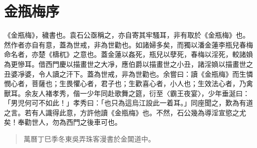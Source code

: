 \chapter*{金瓶梅序}


《金瓶梅》，穢書也。袁石公亟稱之，亦自寄其牢騷耳，非有取於《金瓶梅》也。然作者亦自有意，蓋為世戒，非為世勸也。如諸婦多矣，而獨以潘金蓮李瓶兒春梅命名者，亦楚《檮杌》之意也。蓋金蓮以姦死，瓶兒以孽死，春梅以淫死，較諸媍為更慘耳。借西門慶以描畫世之大凈，應伯爵以描畫世之小丑，諸淫媍以描畫世之丑婆凈婆，令人讀之汗下。蓋為世戒，非為世勸也。余嘗曰：讀《金瓶梅》而生憐憫心者，菩薩也；生畏懼心者，君子也；生歡喜心者，小人也；生效法心者，乃禽獸耳。余友人褚孝秀，偕一少年同赴歌舞之筵，衍至〈霸王夜宴〉，少年垂涎曰：「男児何可不如此！」孝秀曰：「也只為這烏江設此一着耳。」同座聞之，歎為有道之言。若有人識得此意，方許他讀《金瓶梅》也。不然，石公幾為導淫宣慾之尤矣！奉勸世人，勿為西門之後車可也。

\begin{quotation}\begin{flushright}萬曆丁巳季冬東吳弄珠客漫書於金閶道中。\end{flushright}\end{quotation}

